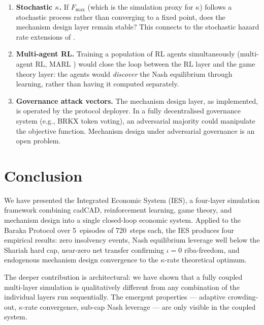\documentclass[10pt,twocolumn]{article}
\theoremstyle{plain}
\theoremstyle{definition}
\begin{document}
\begin{enumerate}[leftmargin=*,noitemsep]
\item \textbf{Stochastic $\kappa$.}  If $F_{\max}$ (which
  is the simulation proxy for $\kappa$) follows a
  stochastic process rather than converging to a fixed
  point, does the mechanism design layer remain stable?
  This connects to the stochastic hazard rate extensions
  of \cite{DuffieSingleton1999}.

\item \textbf{Multi-agent RL.}  Training a population
  of RL agents simultaneously (multi-agent RL,
  MARL \cite{Lowe2017}) would close the loop between
  the RL layer and the game theory layer: the agents
  would \emph{discover} the Nash equilibrium through
  learning, rather than having it computed separately.

\item \textbf{Governance attack vectors.}  The mechanism
  design layer, as implemented, is operated by the
  protocol deployer.  In a fully decentralised governance
  system (e.g., BRKX token voting), an adversarial
  majority could manipulate the objective function.
  Mechanism design under adversarial governance is
  an open problem.
\end{enumerate}

\section{Conclusion}
\label{sec:conclusion}

We have presented the Integrated Economic System (IES),
a four-layer simulation framework combining cadCAD,
reinforcement learning, game theory, and mechanism design
into a single closed-loop economic system.  Applied to
the Baraka Protocol over 5~episodes of 720~steps each,
the IES produces four empirical results: zero insolvency
events, Nash equilibrium leverage well below the Shariah
hard cap, near-zero net transfer confirming $\iota=0$
riba-freedom, and endogenous mechanism design convergence
to the $\kappa$-rate theoretical optimum.

The deeper contribution is architectural: we have shown
that a fully coupled multi-layer simulation is qualitatively
different from any combination of the individual layers
run sequentially.  The emergent properties --- adaptive
crowding-out, $\kappa$-rate convergence, sub-cap Nash
leverage --- are only visible in the coupled system.
\end{document}
